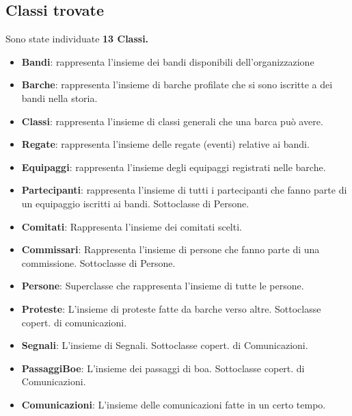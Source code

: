 \documentclass{article}
\begin{document}
\subsection{Classi trovate}

Sono state individuate \textbf{13 Classi.}

\begin{itemize}
    \item \textbf{Bandi}: rappresenta l'insieme dei bandi disponibili dell'organizzazione
    \item \textbf{Barche}: rappresenta l'insieme di barche profilate che si sono iscritte a dei bandi nella storia.
    \item \textbf{Classi}: rappresenta l'insieme di classi generali che una barca può avere.
    \item \textbf{Regate}: rappresenta l'insieme delle regate (eventi) relative ai bandi.
    \item \textbf{Equipaggi}: rappresenta l'insieme degli equipaggi registrati nelle barche.
    \item \textbf{Partecipanti}: rappresenta l'insieme di tutti i partecipanti che fanno parte di un equipaggio iscritti ai bandi. Sottoclasse di Persone.
    \item \textbf{Comitati}: Rappresenta l'insieme dei comitati scelti.
    \item \textbf{Commissari}: Rappresenta l'insieme di persone che fanno parte di una commissione. Sottoclasse di Persone.
    \item \textbf{Persone}: Superclasse che rappresenta l'insieme di tutte le persone.
    \item \textbf{Proteste}: L'insieme di proteste fatte da barche verso altre. Sottoclasse copert. di comunicazioni.
    \item \textbf{Segnali}: L'insieme di Segnali. Sottoclasse copert. di Comunicazioni.
    \item \textbf{PassaggiBoe}: L'insieme dei passaggi di boa. Sottoclasse copert. di Comunicazioni.
    \item \textbf{Comunicazioni}: L'insieme delle comunicazioni fatte in un certo tempo.
\end{itemize}
\end{document}
